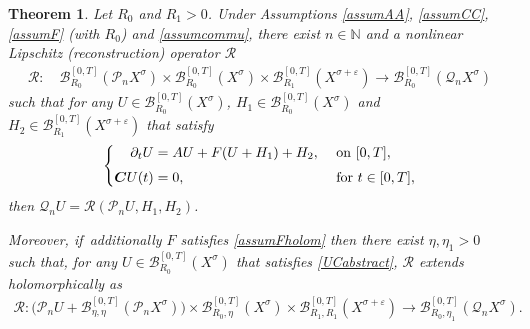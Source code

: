 \documentclass[JEP,XML,SOM,Unicode,published]{cedram}
\newtheorem{theorem}{Theorem}[section]
\theoremstyle{definition}
\let\mc\mathcal
\let\veps\varepsilon
\newcommand{\B}{\mc{B}}
\newcommand{\N}{\mathbb{N}}
\newcommand{\Q}{\mathcal{Q}}
\renewcommand{\P}{\mathcal{P}}
\newcommand{\bC}{\boldsymbol{C}}
\begin{document}
\begin{theorem}
\label{thmabstract}Let $R_{0}$ and $R_{1}>0$. Under Assumptions \ref{assumAA}, \ref{assumCC}, \ref{assumF} (with $R_{0}$) and \ref{assumcommu}, there exist $n\in \N$ and a nonlinear Lipschitz (reconstruction) operator $\mathcal{R}$
\begin{align}
\label{Rspace}
\mathcal{R}: \quad \B_{R_{0}}^{[0,T]}(\P_n X^{\sigma}) \times \B_{R_{0}}^{[0,T]}(X^{\sigma}) \times \B_{R_{1}}^{[0,T]}(X^{\sigma+\veps}) \to \B_{R_{0}}^{[0,T]}(\Q_n X^{\sigma})
\end{align}
such that for any $U\in \B_{R_{0}}^{[0,T]}(X^{\sigma})$, $H_{1}\in \B_{R_{0}}^{[0,T]}(X^{\sigma})$ and $H_{2}\in \B_{R_{1}}^{[0,T]}(X^{\sigma+\veps})$ that satisfy
\begin{align}\label{UCabstract}
\left\{\begin{aligned}
\partial_t U&=AU+F(U+H_{1})+H_{2}, &&\textnormal{ on } [0,T], \\[3pt]
\bC U(t)&=0, &&\textnormal{ for }t\in [0,T],
\end{aligned}\right.
\end{align}
then $\Q_n U=\mathcal{R}(\P_{n}U,H_{1},H_{2})$.

Moreover, if~additionally $F$ satisfies \cref{assumFholom} then there exist $\eta,\eta_1>0$ such that, for any $U\in \B_{R_{0}}^{[0,T]}(X^{\sigma})$ that satisfies \eqref{UCabstract}, $\mathcal{R}$ extends holomorphically as
\begin{align*}
\mathcal{R}: \bigl( \P_nU+ \B_{\eta,\eta}^{[0,T]}(\P_n X^{\sigma})\bigr) \times \B_{R_{0},\eta}^{[0,T]}(X^{\sigma}) \times \B_{R_{1},R_{1}}^{[0,T]}(X^{\sigma+\veps}) \to \B_{R_{0},\eta_1}^{[0,T]}(\Q_n X^{\sigma}).
\end{align*}
\end{theorem}
\end{document}
